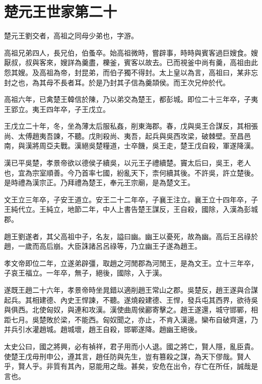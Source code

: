 \chapter{楚元王世家第二十}

楚元王劉交者，高祖之同母少弟也，字游。

高祖兄弟四人，長兄伯，伯蚤卒。始高祖微時，嘗辟事，時時與賓客過巨嫂食。嫂厭叔，叔與客來，嫂詳為羹盡，櫟釜，賓客以故去。已而視釜中尚有羹，高祖由此怨其嫂。及高祖為帝，封昆弟，而伯子獨不得封。太上皇以為言，高祖曰，某非忘封之也，為其母不長者耳。於是乃封其子信為羹頡侯。而王次兄仲於代。

高祖六年，已禽楚王韓信於陳，乃以弟交為楚王，都彭城。即位二十三年卒，子夷王郢立。夷王四年卒，子王戊立。

王戊立二十年，冬，坐為薄太后服私姦，削東海郡。春，戊與吳王合謀反，其相張尚、太傅趙夷吾諫，不聽。戊則殺尚、夷吾，起兵與吳西攻梁，破棘壁。至昌邑南，與漢將周亞夫戰。漢絕吳楚糧道，士卒饑，吳王走，楚王戊自殺，軍遂降漢。

漢已平吳楚，孝景帝欲以德侯子續吳，以元王子禮續楚。竇太后曰，吳王，老人也，宜為宗室順善。今乃首率七國，紛亂天下，柰何續其後。不許吳，許立楚後。是時禮為漢宗正。乃拜禮為楚王，奉元王宗廟，是為楚文王。

文王立三年卒，子安王道立。安王二十二年卒，子襄王注立。襄王立十四年卒，子王純代立。王純立，地節二年，中人上書告楚王謀反，王自殺，國除，入漢為彭城郡。

趙王劉遂者，其父高祖中子，名友，謚曰幽。幽王以憂死，故為幽。高后王呂祿於趙，一歲而高后崩。大臣誅諸呂呂祿等，乃立幽王子遂為趙王。

孝文帝即位二年，立遂弟辟彊，取趙之河閒郡為河閒王，是為文王。立十三年卒，子哀王福立。一年卒，無子，絕後，國除，入于漢。

遂既王趙二十六年，孝景帝時坐晁錯以適削趙王常山之郡。吳楚反，趙王遂與合謀起兵。其相建德、內史王悍諫，不聽。遂燒殺建德、王悍，發兵屯其西界，欲待吳與俱西。北使匈奴，與連和攻漢。漢使曲周侯酈寄擊之。趙王遂還，城守邯鄲，相距七月。吳楚敗於梁，不能西。匈奴聞之，亦止，不肯入漢邊。欒布自破齊還，乃并兵引水灌趙城。趙城壞，趙王自殺，邯鄲遂降。趙幽王絕後。

太史公曰，國之將興，必有禎祥，君子用而小人退。國之將亡，賢人隱，亂臣貴。使楚王戊毋刑申公，遵其言，趙任防與先生，豈有篡殺之謀，為天下僇哉。賢人乎，賢人乎。非質有其內，惡能用之哉。甚矣，安危在出令，存亡在所任，誠哉是言也。